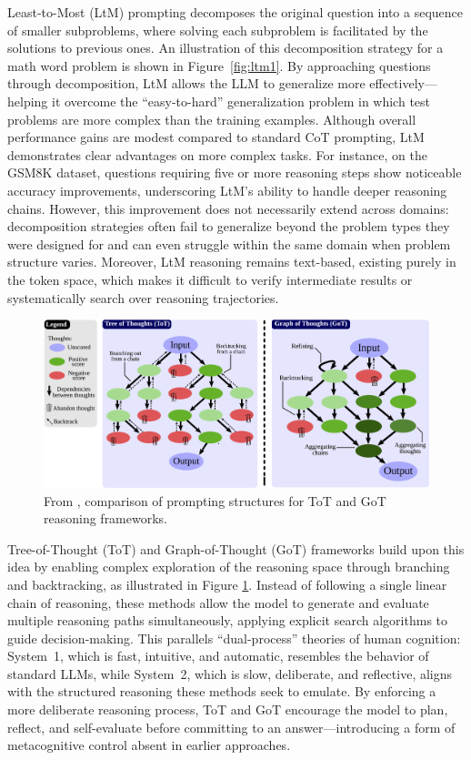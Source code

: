 \documentclass[project]{bsu-cs}  %
\begin{document}
Least-to-Most (LtM) prompting decomposes the original question into a sequence of smaller subproblems, where solving each subproblem is facilitated by the solutions to previous ones. An illustration of this decomposition strategy for a math word problem is shown in Figure~\ref{fig:ltm1}. By approaching questions through decomposition, LtM allows the LLM to generalize more effectively—helping it overcome the ``easy-to-hard'' generalization problem in which test problems are more complex than the training examples. Although overall performance gains are modest compared to standard CoT prompting, LtM demonstrates clear advantages on more complex tasks. For instance, on the GSM8K dataset, questions requiring five or more reasoning steps show noticeable accuracy improvements, underscoring LtM’s ability to handle deeper reasoning chains. However, this improvement does not necessarily extend across domains: decomposition strategies often fail to generalize beyond the problem types they were designed for and can even struggle within the same domain when problem structure varies. Moreover, LtM reasoning remains text-based, existing purely in the token space, which makes it difficult to verify intermediate results or systematically search over reasoning trajectories.

\begin{figure}
    \centering
    \includegraphics[width=0.8\linewidth]{figures/got1.pdf}
    \caption{From \citet{Besta_2024}, comparison of prompting structures for ToT and GoT reasoning frameworks.}
    \label{fig:got1}
\end{figure}

Tree-of-Thought (ToT) and Graph-of-Thought (GoT) frameworks build upon this idea by enabling complex exploration of the reasoning space through branching and backtracking, as illustrated in Figure \ref{fig:got1}. Instead of following a single linear chain of reasoning, these methods allow the model to generate and evaluate multiple reasoning paths simultaneously, applying explicit search algorithms to guide decision-making. This parallels ``dual-process'' theories of human cognition: System~1, which is fast, intuitive, and automatic, resembles the behavior of standard LLMs, while System~2, which is slow, deliberate, and reflective, aligns with the structured reasoning these methods seek to emulate. By enforcing a more deliberate reasoning process, ToT and GoT encourage the model to plan, reflect, and self-evaluate before committing to an answer—introducing a form of metacognitive control absent in earlier approaches. 
\end{document}
